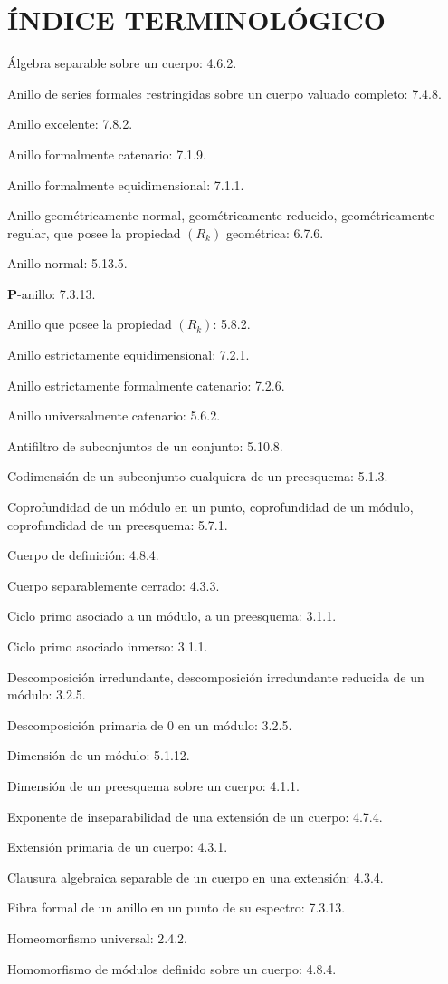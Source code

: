\clearpage
{}
{}
\section*{ÍNDICE TERMINOLÓGICO}

\begingroup
\footnotesize
\setlength{\parindent}{0pt}
\setlength{\parskip}{1.1pt}
\newcommand{\EGAIVtwoTerm}[2]{#1: #2.\par}

\EGAIVtwoTerm{Álgebra separable sobre un cuerpo}{4.6.2}
\EGAIVtwoTerm{Anillo de series formales restringidas sobre un cuerpo valuado completo}{7.4.8}
\EGAIVtwoTerm{Anillo excelente}{7.8.2}
\EGAIVtwoTerm{Anillo formalmente catenario}{7.1.9}
\EGAIVtwoTerm{Anillo formalmente equidimensional}{7.1.1}
\EGAIVtwoTerm{Anillo geométricamente normal, geométricamente reducido,
geométricamente regular, que posee la propiedad $(R_k)$ geométrica}{6.7.6}
\EGAIVtwoTerm{Anillo normal}{5.13.5}
\EGAIVtwoTerm{$\boldsymbol P$-anillo}{7.3.13}
\EGAIVtwoTerm{Anillo que posee la propiedad $(R_k)$}{5.8.2}
\EGAIVtwoTerm{Anillo estrictamente equidimensional}{7.2.1}
\EGAIVtwoTerm{Anillo estrictamente formalmente catenario}{7.2.6}
\EGAIVtwoTerm{Anillo universalmente catenario}{5.6.2}
\EGAIVtwoTerm{Antifiltro de subconjuntos de un conjunto}{5.10.8}

\medskip
\EGAIVtwoTerm{Codimensión de un subconjunto cualquiera de un preesquema}{5.1.3}
\EGAIVtwoTerm{Coprofundidad de un módulo en un punto, coprofundidad de un módulo,
coprofundidad de un preesquema}{5.7.1}
\EGAIVtwoTerm{Cuerpo de definición}{4.8.4}
\EGAIVtwoTerm{Cuerpo separablemente cerrado}{4.3.3}
\EGAIVtwoTerm{Ciclo primo asociado a un módulo, a un preesquema}{3.1.1}
\EGAIVtwoTerm{Ciclo primo asociado inmerso}{3.1.1}

\medskip
\EGAIVtwoTerm{Descomposición irredundante, descomposición irredundante reducida
de un módulo}{3.2.5}
\EGAIVtwoTerm{Descomposición primaria de $0$ en un módulo}{3.2.5}
\EGAIVtwoTerm{Dimensión de un módulo}{5.1.12}
\EGAIVtwoTerm{Dimensión de un preesquema sobre un cuerpo}{4.1.1}

\medskip
\EGAIVtwoTerm{Exponente de inseparabilidad de una extensión de un cuerpo}{4.7.4}
\EGAIVtwoTerm{Extensión primaria de un cuerpo}{4.3.1}

\medskip
\EGAIVtwoTerm{Clausura algebraica separable de un cuerpo en una extensión}{4.3.4}
\EGAIVtwoTerm{Fibra formal de un anillo en un punto de su espectro}{7.3.13}

\medskip
\EGAIVtwoTerm{Homeomorfismo universal}{2.4.2}
\EGAIVtwoTerm{Homomorfismo de módulos definido sobre un cuerpo}{4.8.4}

